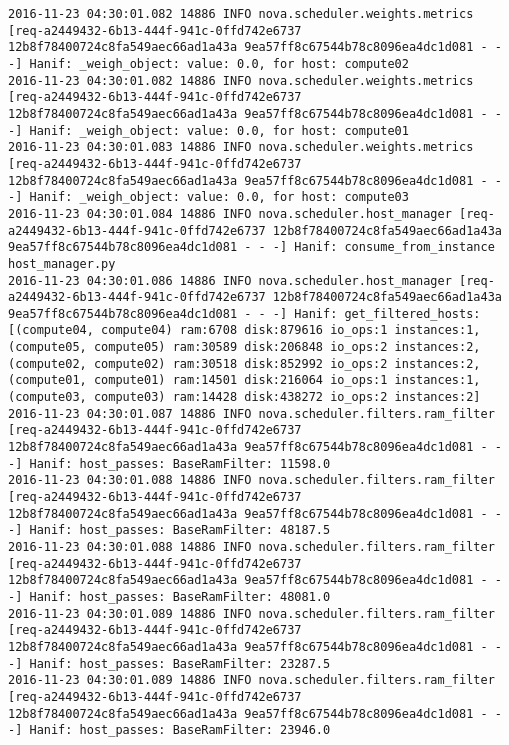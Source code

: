 \begin{lstlisting}[frame=single, caption={The filter scheduler log trace for 10 virtual instances}, label={lst:filterschedulercodetracelog10vi}, escapechar=|]
2016-11-23 04:30:01.082 14886 INFO nova.scheduler.weights.metrics [req-a2449432-6b13-444f-941c-0ffd742e6737 12b8f78400724c8fa549aec66ad1a43a 9ea57ff8c67544b78c8096ea4dc1d081 - - -] Hanif: _weigh_object: value: 0.0, for host: compute02
2016-11-23 04:30:01.082 14886 INFO nova.scheduler.weights.metrics [req-a2449432-6b13-444f-941c-0ffd742e6737 12b8f78400724c8fa549aec66ad1a43a 9ea57ff8c67544b78c8096ea4dc1d081 - - -] Hanif: _weigh_object: value: 0.0, for host: compute01
2016-11-23 04:30:01.083 14886 INFO nova.scheduler.weights.metrics [req-a2449432-6b13-444f-941c-0ffd742e6737 12b8f78400724c8fa549aec66ad1a43a 9ea57ff8c67544b78c8096ea4dc1d081 - - -] Hanif: _weigh_object: value: 0.0, for host: compute03
2016-11-23 04:30:01.084 14886 INFO nova.scheduler.host_manager [req-a2449432-6b13-444f-941c-0ffd742e6737 12b8f78400724c8fa549aec66ad1a43a 9ea57ff8c67544b78c8096ea4dc1d081 - - -] Hanif: consume_from_instance host_manager.py
2016-11-23 04:30:01.086 14886 INFO nova.scheduler.host_manager [req-a2449432-6b13-444f-941c-0ffd742e6737 12b8f78400724c8fa549aec66ad1a43a 9ea57ff8c67544b78c8096ea4dc1d081 - - -] Hanif: get_filtered_hosts: [(compute04, compute04) ram:6708 disk:879616 io_ops:1 instances:1, (compute05, compute05) ram:30589 disk:206848 io_ops:2 instances:2, (compute02, compute02) ram:30518 disk:852992 io_ops:2 instances:2, (compute01, compute01) ram:14501 disk:216064 io_ops:1 instances:1, (compute03, compute03) ram:14428 disk:438272 io_ops:2 instances:2]
2016-11-23 04:30:01.087 14886 INFO nova.scheduler.filters.ram_filter [req-a2449432-6b13-444f-941c-0ffd742e6737 12b8f78400724c8fa549aec66ad1a43a 9ea57ff8c67544b78c8096ea4dc1d081 - - -] Hanif: host_passes: BaseRamFilter: 11598.0
2016-11-23 04:30:01.088 14886 INFO nova.scheduler.filters.ram_filter [req-a2449432-6b13-444f-941c-0ffd742e6737 12b8f78400724c8fa549aec66ad1a43a 9ea57ff8c67544b78c8096ea4dc1d081 - - -] Hanif: host_passes: BaseRamFilter: 48187.5
2016-11-23 04:30:01.088 14886 INFO nova.scheduler.filters.ram_filter [req-a2449432-6b13-444f-941c-0ffd742e6737 12b8f78400724c8fa549aec66ad1a43a 9ea57ff8c67544b78c8096ea4dc1d081 - - -] Hanif: host_passes: BaseRamFilter: 48081.0
2016-11-23 04:30:01.089 14886 INFO nova.scheduler.filters.ram_filter [req-a2449432-6b13-444f-941c-0ffd742e6737 12b8f78400724c8fa549aec66ad1a43a 9ea57ff8c67544b78c8096ea4dc1d081 - - -] Hanif: host_passes: BaseRamFilter: 23287.5
2016-11-23 04:30:01.089 14886 INFO nova.scheduler.filters.ram_filter [req-a2449432-6b13-444f-941c-0ffd742e6737 12b8f78400724c8fa549aec66ad1a43a 9ea57ff8c67544b78c8096ea4dc1d081 - - -] Hanif: host_passes: BaseRamFilter: 23946.0

\end{lstlisting}

